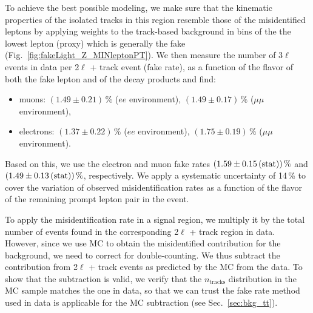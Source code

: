 To achieve the best possible modeling, we make sure that the kinematic properties of the isolated tracks in this region resemble those of the misidentified leptons by applying weights to the track-based background in bins of the the lowest \pt lepton (proxy) which is generally the fake (Fig.~\ref{fig:fakeLight_Z_MINleptonPT}). We then measure the number of 3$\ell$ events in data per 2$\ell$ + track event (fake rate), as a function of the flavor of both the fake lepton and of the \Z decay products and find:
\begin{itemize}
	\item muons: $(1.49 \pm 0.21)\,\%$ ($ee$ environment), $(1.49 \pm 0.17)\,\%$ ($\mu\mu$ environment),
	\item electrons: $(1.37 \pm 0.22)\,\%$ ($ee$ environment), $(1.75 \pm 0.19)\,\%$ ($\mu\mu$ environment).
\end{itemize}
Based on this, we use the electron and muon fake rates $(1.59 \pm 0.15\,\text{(stat)})\,\%$ and $(1.49 \pm 0.13\,\text{(stat)})\,\%$, respectively. We apply a systematic uncertainty of 14\,\% to cover the variation of observed misidentification rates as a function of the flavor of the remaining prompt lepton pair in the event.

To apply the misidentification rate in a signal region, we multiply it by the total number of events found in the corresponding 2$\ell$ + track region in data. However, since we use MC to obtain the misidentified contribution for the \ttbar background, we need to correct for double-counting. We thus subtract the contribution from 2$\ell$ + track events as predicted by the \ttbar MC from the data. To show that the subtraction is valid, we verify that the $n_\textrm{tracks}$ distribution in the \ttbar MC sample matches the one in data, so that we can trust the fake rate method used in data is applicable for the \ttbar MC subtraction (see Sec.~\ref{sec:bkg_tt}).

